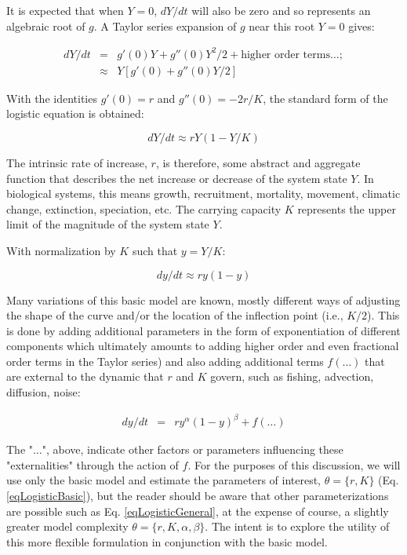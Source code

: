 \documentclass[letterpaper,portrait,11pt]{scrartcl}
\numberwithin{equation}{section}		%
\numberwithin{figure}{section}		%
\numberwithin{table}{section}				%
\begin{document}
\begin{appendices}
It is expected that when $Y = 0$, $dY/dt$ will also be zero and so represents an algebraic root of $g$. A Taylor series expansion of $g$ near this root $Y=0$ gives:

\begin{eqnarray*} 
  \label{eqLogisticTaylorSeries}
  dY / dt &=&  g'(0) Y + g''(0) Y^{2}/2  + \text{higher order terms} \dots; \\
  &\approx& Y [g'(0) + g''(0) Y/2  ]
\end{eqnarray*}


With the identities $g'(0) = r$  and $g''(0) = - 2r/K$, the standard form of the logistic equation is obtained:

\begin{equation} 
\label{eqLogistic}
dY/dt \approx r Y (1 - Y/K)
\end{equation}

The intrinsic rate of increase, $r$, is therefore, some abstract and aggregate function that describes the net increase or decrease of the system state $Y$. In biological systems, this means growth, recruitment, mortality, movement, climatic change, extinction, speciation, etc. The carrying capacity $K$ represents the upper limit of the magnitude of the system state $Y$.

With normalization by $K$ such that $ y = Y/K $:

\begin{equation} 
\label{eqLogisticBasic}
dy/dt  \approx  r y (1 - y)
\end{equation}

Many variations of this basic model are known, mostly different ways of adjusting the shape of the curve and/or the location of the inflection point (i.e., $K/2$). This is done by adding additional parameters in the form of exponentiation of different components which ultimately amounts to adding higher order and even fractional order terms in the Taylor series) and also adding additional terms $f(\dots)$ that are external to the dynamic that $r$ and $K$ govern, such as fishing, advection, diffusion, noise: 

\begin{eqnarray} 
\label{eqLogisticGeneral}
dy / dt &=& r y^{\alpha} ( 1 - y )^{\beta} + f(\dots)
\end{eqnarray}

The "$\dots$", above, indicate other factors or parameters influencing these "externalities" through the action of $f$. For the purposes of this discussion, we will use only the basic model and estimate the parameters of interest, $\theta = \{r, K \}$ (Eq. \ref{eqLogisticBasic}), but the reader should be aware that other parameterizations are possible such as Eq. \ref{eqLogisticGeneral}, at the expense of course, a slightly greater model complexity $\theta=\{r,K,\alpha,\beta\}$. The intent is to explore the utility of this more flexible formulation in conjunction with the basic model. 


\end{appendices}
\end{document}
